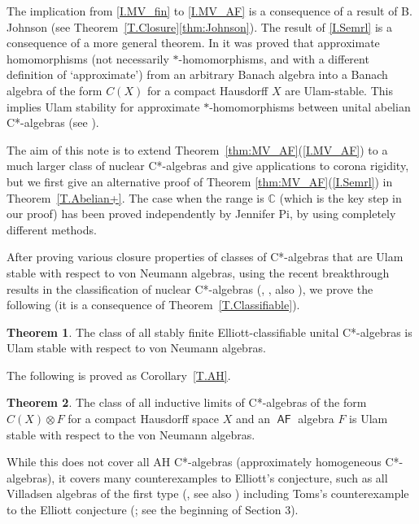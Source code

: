\documentclass[11pt]{amsproc}
\newcommand{\cstar}{C*}
\DeclareMathOperator{\sfAF}{\mathsf {AF}}
\newcommand{\bbC}{\mathbb C}
\theoremstyle{definition}
\newtheorem{thm}{Theorem}
\theoremstyle{plain}
\theoremstyle{remark}
\begin{document}
The implication from \eqref{I.MV_fin} to \eqref{I.MV_AF} is a consequence of a result of B. Johnson (see Theorem~\ref{T.Closure}\eqref{thm:Johnson}). 
The result of \eqref{I.Semrl} is a consequence of a more general theorem. In \cite[Theorem 2.1]{semrl1999non} it was proved that approximate homomorphisms (not necessarily $*$-homomorphisms, and with a different definition of `approximate') from an arbitrary Banach algebra into a Banach algebra of the form $C(X)$ for a compact Hausdorff $X$ are Ulam-stable. This implies Ulam stability for approximate $*$-homomorphisms between unital abelian \cstar-algebras (see \cite[Theorem 5.18]{farah2025corona}). 



The aim of this note is to extend Theorem~\ref{thm:MV_AF}(\ref{I.MV_AF}) to a much larger class of nuclear \cstar-algebras and give applications to corona rigidity, but we first give an alternative proof of Theorem \ref{thm:MV_AF}(\ref{I.Semrl}) in Theorem~\ref{T.Abelian+}. The case when 
 the range is $\bbC$ (which is the key step in our proof) has been proved independently by Jennifer Pi, by using completely different methods. 

After proving various closure properties of  classes of \cstar-algebras that are Ulam stable with respect to von Neumann algebras, 
using the recent breakthrough results in the classification of nuclear \cstar-algebras (\cite{gong2020classificationI}, \cite{gong2020classificationII}, also \cite{carrion2023classifying}), we prove the following (it is a consequence of Theorem~\ref{T.Classifiable}). 

\begin{thm}\label{T.Elliott}
	The class of all stably finite Elliott-classifiable unital \cstar-algebras is Ulam stable with respect to von Neumann algebras. 
\end{thm}

The following is proved as Corollary~\ref{T.AH}. 

\begin{thm}\label{T.C(X)otimesF}
The class of all inductive limits of \cstar-algebras of the form $C(X)\otimes F$ for a compact Hausdorff space $X$ and an $\sfAF$ algebra $F$ is Ulam stable with respect to the von Neumann algebras. 
\end{thm}


While this does not cover all AH \cstar-algebras (approximately homogeneous \cstar-algebras), it covers many counterexamples to Elliott's conjecture, such as all Villadsen algebras of the first type (\cite{Vill:Simple}, see also \cite[\S 3.1]{toms2009Elliott}) including Toms's counterexample to the Elliott conjecture (\cite[Theorem~1.1]{To:On}; see the beginning of Section 3). 
\end{document}
